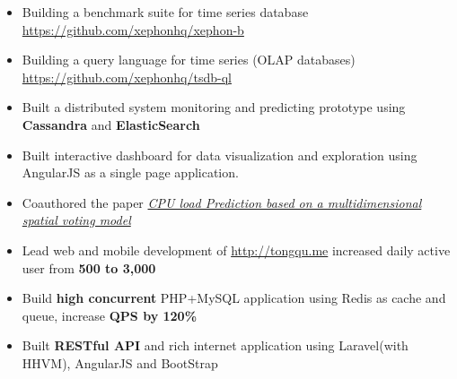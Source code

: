\documentclass[10pt, letterpaper]{simple-cv}
\begin{document}
\begin{itemize}
\item Building a benchmark suite for time series database \url{https://github.com/xephonhq/xephon-b}
\item Building a query language for time series (OLAP databases) \url{https://github.com/xephonhq/tsdb-ql}
\end{itemize}

\begin{itemize}
\item Built a distributed system monitoring and predicting prototype using \textbf{Cassandra} and \textbf{ElasticSearch}
\item Built interactive dashboard for data visualization and exploration using AngularJS as a single page application.
\item Coauthored the paper \textit{\href{https://at15.github.io/pub/cpu_load_prediction.pdf}{CPU load Prediction based on a multidimensional spatial voting model}}
\end{itemize}

\begin{itemize}
\item Lead web and mobile development of \url{http://tongqu.me} increased daily active user from \textbf{500 to 3,000}
\item Build \textbf{high concurrent} PHP+MySQL application using Redis as cache and queue, increase \textbf{QPS by 120\%}
\item Built \textbf{RESTful API} and rich internet application using Laravel(with HHVM), AngularJS and BootStrap
\end{itemize}
\end{document}
